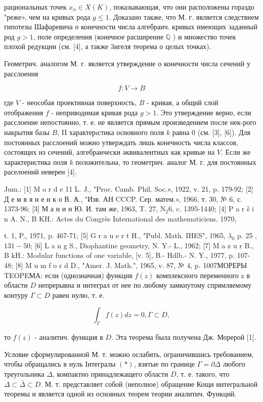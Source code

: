 \documentclass[10pt]{article}
\begin{document}
рациональных точек $x_{n} \in X(K)$, показывающая, что они расположены гораздо "реже», чем на кривых рода $g \leqslant 1$. Доказано также, что М. г. является следствием гипотезы Шафаревича о конечности числа алгебраич. кривых имеющих заданный род $g>1$, поле определения (конечное расширение $\mathbb{Q}$ ) и множество точек плохой редукции (см. [4], а также 3игеля теорема о целых точках).



Геометрич. аналогом М. г. является утверждение о конечности числа сечений у расслоения



\[

f: V \rightarrow B

\]



где $V$ - неособая проективная поверхность, $B$ - кривая, а общий слой отображения $f$ - неприводимая кривая рода $g>1$. Это утверждение верно, если расслоение непостоянно, т. е. не является прямым произведением после нек-рого накрытия базы $B$, II характерıстика основного поля $k$ равна 0 (см. [3], [6]). Для постоянных расслоений можно утверждать лишь конечность числа классов, состоящих из сечений, алгебраически әквивалентных как кривые на $V$. Если же характеристика поля $k$ положительна, то геометрич. аналог М. г. для постоянных раселоений неверен [4].



Jum.: [1] M o r d e 11 L. J., "Proc. Camb. Phil. Soc.», 1922, v. 21, p. 179-92; [2] Д е м в я н е н к о В. А., "Изв. АН CCCP. Сер. матем.», 1966, т. 30, № 6, с. 1373-96; [3] М а н и н Ю. И. там же, 1963, T. 27, $\mathrm{N}_{2} 6$, c. 1395-1440; [4] P a r š i n A. N., B KH.: Actes du Congrès International des mathematiciens. 1970,

t. 1, P., 1971, p. 467-71; [5] G r a u e r t H., "Publ. Math. IHES", 1965, $\mathcal{\lambda}_{0}$ p. 25 , $131-50$; [6] L a n g S., Diophantine geometry, N. Y.- L., 1962; [7] M a z u r B., B kH.: Modular functions of one variable, [v. 5], B.- Hdlb.- N. Y., 1977, p. 107-48; [8] M u m f o r d D., "Amer. J. Math.", 1965, v. 87, № 4, p. 1007МОРЕРЫ TEOPEМА: если (однозначная) функция $f(z)$ комплексного переменного z в области $D$ непрерывна и интеграл от нее по любому замкнутому спрямляемому контуру $\Gamma \subset D$ равен нулю, т. е.



\[

\int_{\Gamma} f(z) d z=0, \Gamma \subset D,

\]



то $f(z)$ - аналитич. функция в $D$. Эта теорема была получена Дж. Морерой [1].



Условие сформулированной М. т. можно ослабить, ограничившись требованием, чтобы обращались в нуль Іитегралы $(*)$, взятые по границе $\Gamma=\partial \Delta$ любого треугольника $\Delta$, компактно принадлежащего области $D$, т. е. такого, что $\Delta \subset \bar{\Delta} \subset D$. М. т. представляет собой (неполное) обращение Кощи интегральной теоремы и является одной из основных теорем теории аналитич. Функций.
\end{document}
